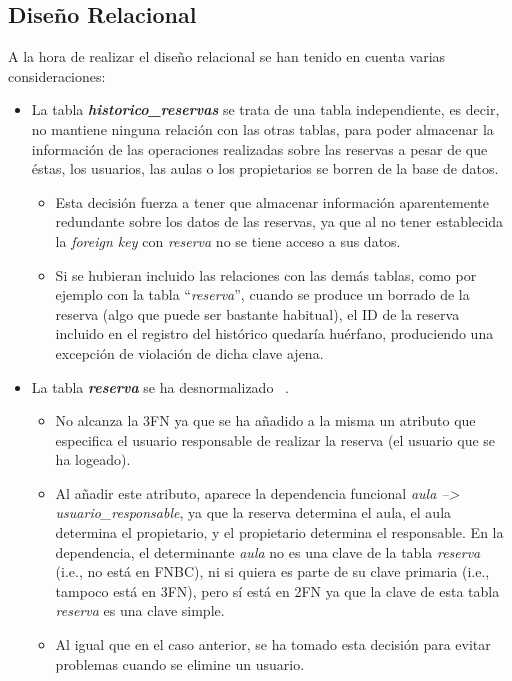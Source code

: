 \subsection{Diseño Relacional}
A la hora de realizar el diseño relacional se han tenido en cuenta varias consideraciones:
\begin{itemize}
    \item La tabla \textbf{\textit{historico\_reservas}} se trata de una tabla independiente, es decir, no mantiene ninguna relación con las otras tablas, para poder almacenar la información de las operaciones realizadas sobre las reservas a pesar de que éstas, los usuarios, las aulas o los propietarios se borren de la base de datos. 
    
        \begin{itemize}
            \item Esta decisión fuerza a tener que almacenar información aparentemente redundante sobre los datos de las reservas, ya que al no tener establecida la \textit{foreign key} con \textit{reserva} no se tiene acceso a sus datos.
            
            \item Si se hubieran incluido las relaciones con las demás tablas, como por ejemplo con la tabla ``\textit{reserva}'', cuando se produce un borrado de la reserva (algo que puede ser bastante habitual), el ID de la reserva incluido en el registro del histórico quedaría huérfano, produciendo una excepción de violación de dicha clave ajena.
        \end{itemize}
        
    \item La tabla \textbf{\textit{reserva}} se ha desnormalizado ~\cite{8104}. 
        \begin{itemize}
            \item No alcanza la 3FN ya que se ha añadido a la misma un atributo que especifica el usuario responsable de realizar la reserva (el usuario que se ha logeado).
            \item Al añadir este atributo, aparece la dependencia funcional \textit{aula --> usuario\_responsable}, ya que la reserva determina el aula, el aula determina el propietario, y el propietario determina el responsable. En la dependencia, el determinante \textit{aula} no es una clave de la tabla \textit{reserva} (i.e., no está en FNBC), ni si quiera es parte de su clave primaria (i.e., tampoco está en 3FN), pero sí está en 2FN ya que la clave de esta tabla \textit{reserva} es una clave simple.
            \item Al igual que en el caso anterior, se ha tomado esta decisión para evitar problemas cuando se elimine un usuario.
        \end{itemize}
\end{itemize}

